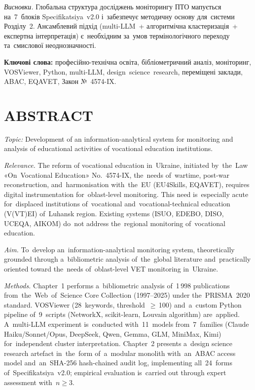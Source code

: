 \textit{Висновки.} Глобальна структура досліджень моніторингу ПТО мапується на~7~блоків Specifikatsiya~v2.0 і~забезпечує методичну основу для~системи Розділу~2. Ансамблевий підхід (multi-LLM~+ алгоритмічна кластеризація~+ експертна інтерпретація) є~необхідним за~умов термінологічного переходу та~смислової неоднозначності.

\textbf{Ключові слова:} професійно-технічна освіта, бібліометричний аналіз, моніторинг, VOSViewer, Python, multi-LLM, design~science~research, переміщені заклади, ABAC, EQAVET, Закон №~4574-IX.

\clearpage

\section*{\centering ABSTRACT}

\textit{Topic:} Development of an information-analytical system for monitoring and analysis of educational activities of vocational education institutions.

\textit{Relevance.} The reform of vocational education in~Ukraine, initiated by~the~Law «On~Vocational Education» No.~4574-IX, the~needs of~wartime, post-war reconstruction, and~harmonisation with~the~EU (EU4Skills, EQAVET), requires digital instrumentation for~oblast-level monitoring. This need is~especially acute for~displaced institutions of~vocational and~vocational-technical education (V(VT)EI) of~Luhansk region. Existing systems (ISUO, EDEBO, DISO, UCEQA, AIKOM) do~not address the~regional monitoring of~vocational education.

\textit{Aim.} To~develop an~information-analytical monitoring system, theoretically grounded through a~bibliometric analysis of~the~global literature and~practically oriented toward the~needs of~oblast-level VET monitoring in~Ukraine.

\textit{Methods.} Chapter~1 performs a~bibliometric analysis of~1\,998 publications from~the~Web~of~Science Core Collection (1997--2025) under the~PRISMA~2020 standard. VOSViewer (28~keywords, threshold~$\geq$\,100) and~a~custom Python pipeline of~9~scripts (NetworkX, scikit-learn, Louvain algorithm) are~applied. A~multi-LLM experiment is~conducted with~11~models from~7~families (Claude Haiku/Sonnet/Opus, DeepSeek, Qwen, Gemma, GLM, MiniMax, Kimi) for~independent cluster interpretation. Chapter~2 presents a~design science research artefact in~the~form of~a~modular monolith with~an~ABAC access model and~an~SHA-256 hash-chained audit log, implementing all~24~forms of~Specifikatsiya~v2.0; empirical evaluation is~carried out through expert assessment with~$n\geq 3$.

